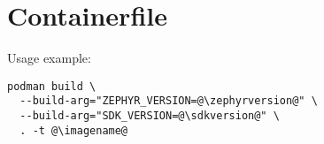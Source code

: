 \section{Containerfile}\label{containerfile}



Usage example:

\begin{lstlisting}
podman build \
  --build-arg="ZEPHYR_VERSION=@\zephyrversion@" \
  --build-arg="SDK_VERSION=@\sdkversion@" \
  . -t @\imagename@
\end{lstlisting}



